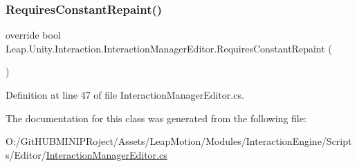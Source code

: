\mbox{\label{class_leap_1_1_unity_1_1_interaction_1_1_interaction_manager_editor_a874c2b8aa6579b0ecaf9670da4b36c3e}} 
\subsubsection{\texorpdfstring{RequiresConstantRepaint()}{RequiresConstantRepaint()}}
{\footnotesize\ttfamily override bool Leap.\+Unity.\+Interaction.\+Interaction\+Manager\+Editor.\+Requires\+Constant\+Repaint (\begin{DoxyParamCaption}{ }\end{DoxyParamCaption})}



Definition at line 47 of file Interaction\+Manager\+Editor.\+cs.



The documentation for this class was generated from the following file\+:\begin{DoxyCompactItemize}
\item 
O\+:/\+Git\+H\+U\+B\+M\+I\+N\+I\+P\+Roject/\+Assets/\+Leap\+Motion/\+Modules/\+Interaction\+Engine/\+Scripts/\+Editor/\mbox{\hyperlink{_interaction_manager_editor_8cs}{Interaction\+Manager\+Editor.\+cs}}\end{DoxyCompactItemize}
